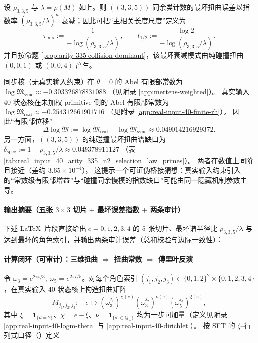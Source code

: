 \begin{remark}\label{cor:arity-335-collision-mixing-scale}
设 \(\rho_{3,3,5}\) 与 \(\lambda=\rho(M)\) 如上。则 \(((3,3,5))\) 同余类计数的最坏扭曲误差以指数率
\(
(\rho_{3,3,5}/\lambda)^n
\)
衰减；因此可把“主相关长度尺度”定义为
$$
\tau_{\mathrm{mix}}:=\frac{1}{-\log(\rho_{3,3,5}/\lambda)},
\qquad
t_{1/2}:=\frac{\log 2}{-\log(\rho_{3,3,5}/\lambda)}.
$$
并且按命题 \ref{prop:arity-335-collision-dominant}，该最坏衰减模式由纯碰撞扭曲 $(0,0,1)$ 或 $(0,0,4)$ 产生。
\end{remark}

\begin{remark}\label{rem:arity-335-logm-gap-bridge}
同步核（无真实输入约束）在 \(\theta=0\) 的 Abel 有限部常数为
\(
\log\mathfrak{M}_{\mathrm{sync}}\approx -0.303326878831088
\)
（见附录 \ref{app:mertens-weighted}）。
真实输入 \(40\) 状态核在未加权 primitive 侧的 Abel 有限部常数为
\(
\log\mathfrak{M}_{\mathrm{real}}\approx -0.254312661901716
\)
（见附录 \ref{app:real-input-40-finite-rh}）。
因此“有限部位移”
\[
\Delta\log\mathfrak{M}:=\log\mathfrak{M}_{\mathrm{real}}-\log\mathfrak{M}_{\mathrm{sync}}
\approx 0.049014216929372.
\]
另一方面，\(((3,3,5))\) 的纯碰撞最坏扭曲谱缺口为
\(
\delta_{\mathrm{spec}}:=1-\rho_{3,3,5}/\lambda\approx 0.049378911127
\)
（表 \ref{tab:real_input_40_arity_335_n2_selection_law_primes}）。
两者在数值上同阶且接近（差约 \(3.65\times 10^{-4}\)）。
这提示一个可证伪桥接猜想：真实输入约束引入的“常数级有限部增益”与“碰撞同余慢模的指数缺口”可能由同一隐藏机制参数主导。
\end{remark}

\paragraph{输出摘要（五张 \texorpdfstring{$3\times 3$}{3x3} 切片 \texorpdfstring{$+$}{+} 最坏误差指数 \texorpdfstring{$+$}{+} 两条审计）}
下述 \LaTeX\ 片段直接给出 $c=0,1,2,3,4$ 的 5 张切片、最坏谱半径比 $\rho_{3,3,5}/\lambda$ 与达到最坏的角色索引，并输出两条审计误差（总和校验与边际一致性）：
\paragraph{计算闭环（可审计）：三维扭曲 $\Rightarrow$ 扭曲常数 $\Rightarrow$ 傅里叶反演}
令 $\omega_3=e^{2\pi i/3},\ \omega_5=e^{2\pi i/5}$。对每个角色索引 $(j_1,j_2,j_3)\in\{0,1,2\}^2\times\{0,1,2,3,4\}$，在真实输入 40 状态核上构造扭曲矩阵
$$
M_{j_1,j_2,j_3}:\quad
e\mapsto (\omega_3^{j_1})^{\chi(e)}(\omega_3^{j_2})^{\nu(e)}(\omega_5^{j_3})^{\xi(e)},
$$
其中 $\xi=\mathbf{1}_{\{d=2\}}$、$\chi=e-\xi$、$\nu=\mathbf{1}_{\{s'\in Q_-\}}$ 均为一步可加量（定义见附录 \ref{app:real-input-40-logm-theta} 与 \ref{app:real-input-40-dirichlet}）。
按 SFT 的 $\zeta$--行列式口径（\cite{BrinStuck2002}）定义
$$
